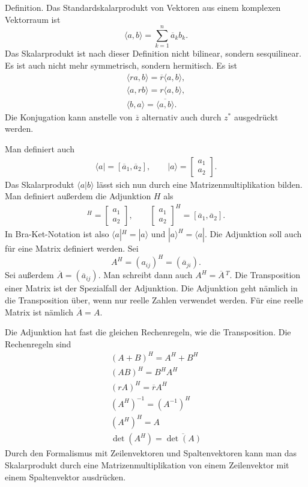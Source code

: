 \documentclass[a4paper,10pt,fleqn,twocolumn,twoside]{article}
\begin{document}
Definition. Das Standardskalarprodukt von Vektoren aus einem komplexen
Vektorraum ist
\[\langle a,b\rangle = \sum_{k=1}^n \overline a_kb_k.\]
Das Skalarprodukt ist nach dieser Definition nicht bilinear, sondern
sesquilinear. Es ist auch nicht mehr symmetrisch, sondern hermitisch.
Es ist
\begin{gather*}
\langle ra,b\rangle = \overline r\langle a,b\rangle,\\
\langle a,rb\rangle = r\langle a,b\rangle,\\
\langle b,a\rangle = \overline{\langle a,b\rangle}.
\end{gather*}
Die Konjugation kann anstelle von $\overline z$ alternativ auch
durch $z^\ast$ ausgedrückt werden.

Man definiert auch
\begin{gather*}
\langle a| = [\overline a_1,\overline a_2],\qquad
|a\rangle = \begin{bmatrix}a_1\\ a_2\end{bmatrix}.
\end{gather*}
Das Skalarprodukt $\langle a|b\rangle$ lässt sich nun durch eine
Matrizenmultiplikation bilden. Man definiert außerdem die
Adjunktion $H$ als
\begin{gather*}
[\overline a_1,\overline a_2]^H
= \begin{bmatrix}a_1\\ a_2\end{bmatrix},\qquad
\begin{bmatrix}a_1\\ a_2\end{bmatrix}^H
= [\overline a_1,\overline a_2].
\end{gather*}
In Bra-Ket-Notation ist also $\langle a|^H=|a\rangle$ und
$|a\rangle^H=\langle a|$. Die Adjunktion soll auch für eine Matrix
definiert werden. Sei
\[A^H = (a_{ij})^H = (\overline a_{ji}).\]
Sei außerdem $\overline A=(\overline a_{ij})$. Man schreibt dann
auch $A^H = \overline A\,{}^T$. Die Transposition einer Matrix ist
der Spezialfall der Adjunktion. Die Adjunktion geht nämlich in die
Transposition über, wenn nur reelle Zahlen verwendet werden. Für eine
reelle Matrix ist nämlich $\overline A=A$.

Die Adjunktion hat fast die gleichen Rechenregeln, wie die
Transposition. Die Rechenregeln sind
\begin{gather*}
(A+B)^H = A^H+B^H\\
(AB)^H = B^H A^H\\
(rA)^H = \overline r A^H\\
(A^H)^{-1} = (A^{-1})^H\\
(A^H)^H = A\\
\det(A^H) = \overline{\det(A)}
\end{gather*}
Durch den Formalismus mit Zeilenvektoren und Spaltenvektoren kann man
das Skalarprodukt durch eine Matrizenmultiplikation von einem
Zeilenvektor mit einem Spaltenvektor ausdrücken.
\end{document}
